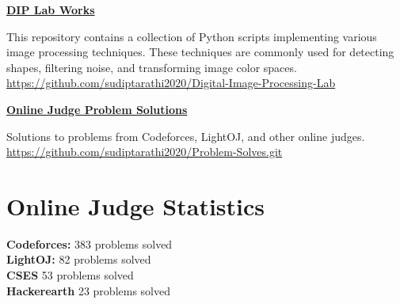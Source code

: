 \documentclass[a4paper,10pt]{article}
\begin{document}
\href{https://github.com/sudiptarathi2020/Digital-Image-Processing-Lab}{\textbf{DIP Lab Works}}
\begin{boxB}
    This repository contains a collection of Python scripts implementing various image processing techniques. These techniques are commonly used for detecting shapes, filtering noise, and transforming image color spaces.\\ \href{https://github.com/sudiptarathi2020/Digital-Image-Processing-Lab}{https://github.com/sudiptarathi2020/Digital-Image-Processing-Lab}
\end{boxB}


\href{https://github.com/sudiptarathi2020/Problem-Solves.git}{\textbf{Online Judge Problem Solutions}}
\begin{boxB}
    Solutions to problems from Codeforces, LightOJ, and other online judges. \\  \href{https://github.com/sudiptarathi2020/Problem-Solves.git}{https://github.com/sudiptarathi2020/Problem-Solves.git}
\end{boxB}




\section*{Online Judge Statistics}
\begin{multicols}{2}
\textbf{Codeforces:} 383 problems solved \\
\textbf{LightOJ:} 82 problems solved \\
\textbf{CSES} 53 problems solved \\
\textbf{Hackerearth} 23 problems solved
\end{multicols}
\end{document}
